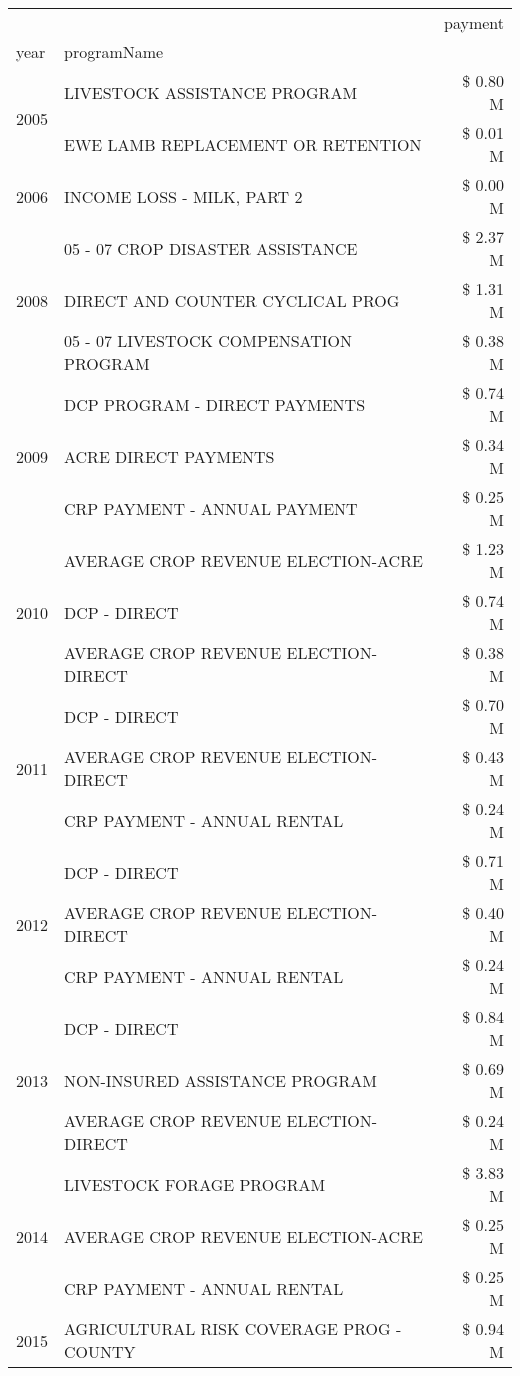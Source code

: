 \begin{tabular}{llr}
\toprule
 &  & payment \\
year & programName &  \\
\midrule
\multirow[t]{2}{*}{2005} & LIVESTOCK ASSISTANCE PROGRAM & \$ 0.80 M \\
 & EWE LAMB REPLACEMENT OR RETENTION & \$ 0.01 M \\
\cline{1-3}
2006 & INCOME LOSS - MILK, PART 2 & \$ 0.00 M \\
\cline{1-3}
\multirow[t]{3}{*}{2008} & 05 - 07 CROP DISASTER ASSISTANCE & \$ 2.37 M \\
 & DIRECT AND COUNTER CYCLICAL PROG & \$ 1.31 M \\
 & 05 - 07 LIVESTOCK COMPENSATION PROGRAM & \$ 0.38 M \\
\cline{1-3}
\multirow[t]{3}{*}{2009} & DCP PROGRAM - DIRECT PAYMENTS & \$ 0.74 M \\
 & ACRE DIRECT PAYMENTS & \$ 0.34 M \\
 & CRP PAYMENT - ANNUAL PAYMENT & \$ 0.25 M \\
\cline{1-3}
\multirow[t]{3}{*}{2010} & AVERAGE CROP REVENUE ELECTION-ACRE & \$ 1.23 M \\
 & DCP - DIRECT & \$ 0.74 M \\
 & AVERAGE CROP REVENUE ELECTION-DIRECT & \$ 0.38 M \\
\cline{1-3}
\multirow[t]{3}{*}{2011} & DCP - DIRECT & \$ 0.70 M \\
 & AVERAGE CROP REVENUE ELECTION-DIRECT & \$ 0.43 M \\
 & CRP PAYMENT - ANNUAL RENTAL & \$ 0.24 M \\
\cline{1-3}
\multirow[t]{3}{*}{2012} & DCP - DIRECT & \$ 0.71 M \\
 & AVERAGE CROP REVENUE ELECTION-DIRECT & \$ 0.40 M \\
 & CRP PAYMENT - ANNUAL RENTAL & \$ 0.24 M \\
\cline{1-3}
\multirow[t]{3}{*}{2013} & DCP - DIRECT & \$ 0.84 M \\
 & NON-INSURED ASSISTANCE PROGRAM & \$ 0.69 M \\
 & AVERAGE CROP REVENUE ELECTION-DIRECT & \$ 0.24 M \\
\cline{1-3}
\multirow[t]{3}{*}{2014} & LIVESTOCK FORAGE PROGRAM & \$ 3.83 M \\
 & AVERAGE CROP REVENUE ELECTION-ACRE & \$ 0.25 M \\
 & CRP PAYMENT - ANNUAL RENTAL & \$ 0.25 M \\
\cline{1-3}
\multirow[t]{3}{*}{2015} & AGRICULTURAL RISK COVERAGE PROG - COUNTY & \$ 0.94 M \\

\end{tabular}
